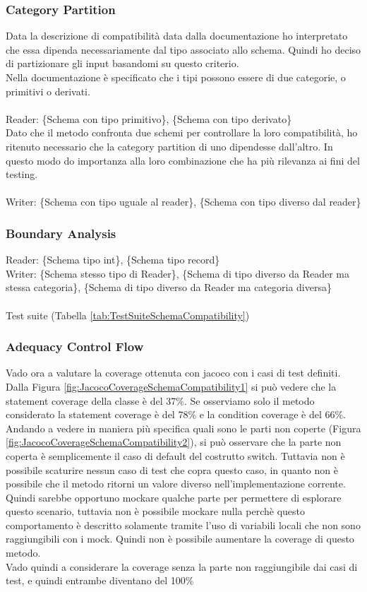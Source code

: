\documentclass[10pt, a4paper]{article}
\begin{document}
\subsubsection{Category Partition}


Data la descrizione di compatibilità data dalla documentazione ho interpretato che essa dipenda necessariamente dal tipo 
associato allo schema. Quindi ho deciso di partizionare gli input basandomi su questo criterio. \\
Nella documentazione è specificato che i tipi possono essere di due categorie, o primitivi o derivati.\\ \\
Reader: \{Schema con tipo primitivo\}, \{Schema con tipo derivato\} \\
Dato che il metodo confronta due schemi per controllare la loro compatibilità, ho ritenuto necessario che la category partition
di uno dipendesse dall'altro. In questo modo do importanza alla loro combinazione che ha più rilevanza ai fini del testing.\\ \\
Writer: \{Schema con tipo uguale al reader\}, \{Schema con tipo diverso dal reader\}


\subsubsection{Boundary Analysis}

Reader: \{Schema tipo int\}, \{Schema tipo record\} \\
Writer: \{Schema stesso tipo di Reader\}, \{Schema di tipo diverso da Reader ma stessa categoria\}, \{Schema di tipo diverso da Reader ma categoria diversa\} \\ \\
Test suite (Tabella \ref{tab:TestSuiteSchemaCompatibility})

\subsubsection{Adequacy Control Flow}
Vado ora a valutare la coverage ottenuta con jacoco con i casi di test definiti.
Dalla Figura \ref{fig:JacocoCoverageSchemaCompatibility1} si può vedere che la statement coverage della classe è del 37\%.
Se osserviamo solo il metodo considerato la statement coverage è del 78\% e la condition coverage è del 66\%.
Andando a vedere in maniera più specifica quali sono le parti non coperte (Figura \ref{fig:JacocoCoverageSchemaCompatibility2}),
si può osservare che la parte non coperta è semplicemente il caso di default del costrutto switch.
Tuttavia non è possibile scaturire nessun caso di test che copra questo caso, in quanto non è possibile che il metodo
ritorni un valore diverso nell'implementazione corrente. Quindi sarebbe opportuno mockare qualche parte per permettere
di esplorare questo scenario, tuttavia non è possibile mockare nulla perchè questo comportamento è descritto solamente
tramite l'uso di variabili locali che non sono raggiungibili con i mock. Quindi non è possibile aumentare la coverage
di questo metodo. \\
Vado quindi a considerare la coverage senza la parte non raggiungibile dai casi di test, e quindi entrambe diventano del 100\%
\end{document}
